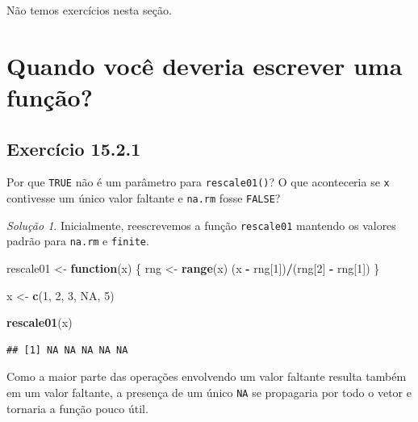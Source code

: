 \documentclass[
]{latex/krantz}
\newenvironment{Shaded}{\begin{snugshade}}{\end{snugshade}}
\newcommand{\ConstantTok}[1]{\textcolor[rgb]{0.56,0.35,0.01}{#1}}
\newcommand{\ControlFlowTok}[1]{\textcolor[rgb]{0.13,0.29,0.53}{\textbf{#1}}}
\newcommand{\DecValTok}[1]{\textcolor[rgb]{0.00,0.00,0.81}{#1}}
\newcommand{\FunctionTok}[1]{\textcolor[rgb]{0.13,0.29,0.53}{\textbf{#1}}}
\newcommand{\NormalTok}[1]{#1}
\newcommand{\OtherTok}[1]{\textcolor[rgb]{0.56,0.35,0.01}{#1}}
\newcommand{\SpecialCharTok}[1]{\textcolor[rgb]{0.81,0.36,0.00}{\textbf{#1}}}
\theoremstyle{definition}
\theoremstyle{definition}
\theoremstyle{definition}
\theoremstyle{definition}
\theoremstyle{remark}
\newtheorem*{solution}{Solução}
\begin{document}
Não temos exercícios nesta seção.

\hypertarget{quando-vocuxea-deveria-escrever-uma-funuxe7uxe3o}{%
\section{Quando você deveria escrever uma função?}\label{quando-vocuxea-deveria-escrever-uma-funuxe7uxe3o}}

\hypertarget{exr15-2-1}{%
\subsection*{Exercício 15.2.1}\label{exr15-2-1}}

Por que \texttt{TRUE} não é um parâmetro para \texttt{rescale01()}? O que aconteceria se \texttt{x} contivesse um único valor faltante e \texttt{na.rm} fosse \texttt{FALSE}?

\begin{solution}
Inicialmente, reescrevemos a função \texttt{rescale01} mantendo os valores padrão para \texttt{na.rm} e \texttt{finite}.

\begin{Shaded}
\begin{Highlighting}[]
\NormalTok{rescale01 }\OtherTok{\textless{}{-}} \ControlFlowTok{function}\NormalTok{(x) \{}
\NormalTok{  rng }\OtherTok{\textless{}{-}} \FunctionTok{range}\NormalTok{(x)}
\NormalTok{  (x }\SpecialCharTok{{-}}\NormalTok{ rng[}\DecValTok{1}\NormalTok{])}\SpecialCharTok{/}\NormalTok{(rng[}\DecValTok{2}\NormalTok{] }\SpecialCharTok{{-}}\NormalTok{ rng[}\DecValTok{1}\NormalTok{])}
\NormalTok{\}}

\NormalTok{x }\OtherTok{\textless{}{-}} \FunctionTok{c}\NormalTok{(}\DecValTok{1}\NormalTok{, }\DecValTok{2}\NormalTok{, }\DecValTok{3}\NormalTok{, }\ConstantTok{NA}\NormalTok{, }\DecValTok{5}\NormalTok{)}

\FunctionTok{rescale01}\NormalTok{(x)}
\end{Highlighting}
\end{Shaded}

\begin{verbatim}
## [1] NA NA NA NA NA
\end{verbatim}

Como a maior parte das operações envolvendo um valor faltante resulta também em um valor faltante, a presença de um único \texttt{NA} se propagaria por todo o vetor e tornaria a função pouco útil.
\end{solution}
\end{document}
